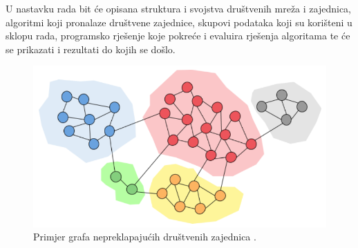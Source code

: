 U nastavku rada bit će opisana struktura i svojstva društvenih mreža i zajednica, algoritmi koji pronalaze društvene zajednice, skupovi podataka koji su korišteni u sklopu rada, programsko rješenje koje pokreće i evaluira rješenja algoritama te će se prikazati i rezultati  do kojih se došlo. 


\begin{figure}
	\includegraphics[width=\linewidth]{images/simple-community.png}
	\caption{Primjer grafa nepreklapajućih društvenih zajednica \cite{jayawickrama_2021}.}
	\label{fig:comm1}
\end{figure}
